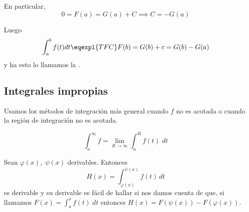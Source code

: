 \documentclass[nochap]{apuntes}
\begin{document}
En particular, \[ 0 = F(a) = G(a) + C \implies C = -G(a) \]

Luego \[\int_a^b f(t) dt \eqexpl{TFC} F(b) = G(b) + c = G(b) - G(a)\] y ha esto lo llamamos la .


\subsection{Integrales impropias}

Usamos los métodos de integración más general cuando $f$ no es acotada o cuando la región de integración no es acotada.

\[ \int_a^\infty f = \lim_{R\to\infty}\int_a^R f(t)\;dt \]

Sean $\varphi(x),\; \psi(x)$ derivables. Entonces
\[H(x)=\int_{\varphi(x)}^{\psi(x)}f(t)\,dt \] es derivable y su derivable es fácil de hallar si nos damos cuenta de que, si llamamos $F(x)=\int_a^xf(t)\; dt$ entonces $H(x) = F(\psi(x))-F(\varphi(x))$.
\newpage
\printindex
\end{document}
